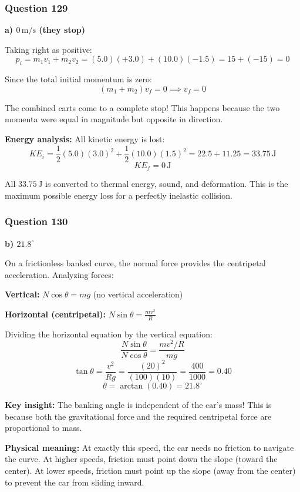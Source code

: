 \documentclass[12pt,letterpaper]{article}
\begin{document}
\subsubsection*{Question 129}

\begin{answerbox}
\textbf{a) $0\,\text{m/s}$ (they stop)}
\end{answerbox}

\begin{explanationbox}
Taking right as positive:
\[
p_i = m_1 v_1 + m_2 v_2 = (5.0)(+3.0) + (10.0)(-1.5) = 15 + (-15) = 0
\]

Since the total initial momentum is zero:
\[
(m_1 + m_2)v_f = 0 \implies v_f = 0
\]

The combined carts come to a complete stop! This happens because the two momenta were equal in magnitude but opposite in direction.

\textbf{Energy analysis:} All kinetic energy is lost:
\[
KE_i = \frac{1}{2}(5.0)(3.0)^2 + \frac{1}{2}(10.0)(1.5)^2 = 22.5 + 11.25 = 33.75\,\text{J}
\]
\[
KE_f = 0\,\text{J}
\]

All $33.75\,\text{J}$ is converted to thermal energy, sound, and deformation. This is the maximum possible energy loss for a perfectly inelastic collision.
\end{explanationbox}

\subsubsection*{Question 130}

\begin{answerbox}
\textbf{b) $21.8^\circ$}
\end{answerbox}

\begin{explanationbox}
On a frictionless banked curve, the normal force provides the centripetal acceleration. Analyzing forces:

\textbf{Vertical:} $N\cos\theta = mg$ (no vertical acceleration)

\textbf{Horizontal (centripetal):} $N\sin\theta = \frac{mv^2}{R}$

Dividing the horizontal equation by the vertical equation:
\[
\frac{N\sin\theta}{N\cos\theta} = \frac{mv^2/R}{mg}
\]
\[
\tan\theta = \frac{v^2}{Rg} = \frac{(20)^2}{(100)(10)} = \frac{400}{1000} = 0.40
\]
\[
\theta = \arctan(0.40) = 21.8^\circ
\]

\textbf{Key insight:} The banking angle is independent of the car's mass! This is because both the gravitational force and the required centripetal force are proportional to mass.

\textbf{Physical meaning:} At exactly this speed, the car needs no friction to navigate the curve. At higher speeds, friction must point down the slope (toward the center). At lower speeds, friction must point up the slope (away from the center) to prevent the car from sliding inward.
\end{explanationbox}
\end{document}

